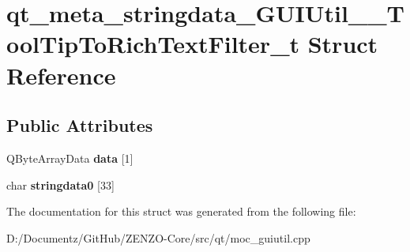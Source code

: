 \hypertarget{structqt__meta__stringdata___g_u_i_util_____tool_tip_to_rich_text_filter__t}{}\section{qt\+\_\+meta\+\_\+stringdata\+\_\+\+G\+U\+I\+Util\+\_\+\+\_\+\+Tool\+Tip\+To\+Rich\+Text\+Filter\+\_\+t Struct Reference}
\label{structqt__meta__stringdata___g_u_i_util_____tool_tip_to_rich_text_filter__t}
\subsection*{Public Attributes}
\begin{DoxyCompactItemize}
\item 
\mbox{\label{structqt__meta__stringdata___g_u_i_util_____tool_tip_to_rich_text_filter__t_a135ff8a1cdfc69dc9c4d8c2121d0ff75}} 
Q\+Byte\+Array\+Data {\bfseries data} \mbox{[}1\mbox{]}
\item 
\mbox{\label{structqt__meta__stringdata___g_u_i_util_____tool_tip_to_rich_text_filter__t_a77ffc603d04d182a9730ec420d15b1d3}} 
char {\bfseries stringdata0} \mbox{[}33\mbox{]}
\end{DoxyCompactItemize}


The documentation for this struct was generated from the following file\+:\begin{DoxyCompactItemize}
\item 
D\+:/\+Documentz/\+Git\+Hub/\+Z\+E\+N\+Z\+O-\/\+Core/src/qt/moc\+\_\+guiutil.\+cpp\end{DoxyCompactItemize}
